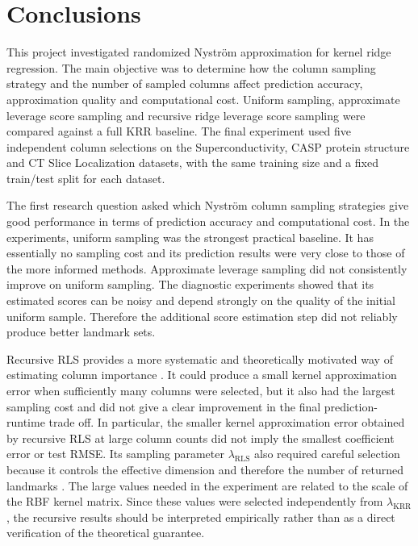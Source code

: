 \chapter{Conclusions}

This project investigated randomized Nystr\"om approximation for kernel ridge regression. The main objective was to determine how the column sampling strategy and the number of sampled columns affect prediction accuracy, approximation quality and computational cost. Uniform sampling, approximate leverage score sampling and recursive ridge leverage score sampling were compared against a full KRR baseline. The final experiment used five independent column selections on the Superconductivity, CASP protein structure and CT Slice Localization datasets, with the same training size and a fixed train/test split for each dataset.

The first research question asked which Nystr\"om column sampling strategies give good performance in terms of prediction accuracy and computational cost. In the experiments, uniform sampling was the strongest practical baseline. It has essentially no sampling cost and its prediction results were very close to those of the more informed methods. Approximate leverage sampling did not consistently improve on uniform sampling. The diagnostic experiments showed that its estimated scores can be noisy and depend strongly on the quality of the initial uniform sample. Therefore the additional score estimation step did not reliably produce better landmark sets.

Recursive RLS provides a more systematic and theoretically motivated way of estimating column importance \citep{musco2017recursive}. It could produce a small kernel approximation error when sufficiently many columns were selected, but it also had the largest sampling cost and did not give a clear improvement in the final prediction-runtime trade off. In particular, the smaller kernel approximation error obtained by recursive RLS at large column counts did not imply the smallest coefficient error or test RMSE. Its sampling parameter $\lambda_{\mathrm{RLS}}$ also required careful selection because it controls the effective dimension and therefore the number of returned landmarks \citep{alaoui2015fast,musco2017recursive}. The large values needed in the experiment are related to the scale of the RBF kernel matrix. Since these values were selected independently from $\lambda_{\mathrm{KRR}}$, the recursive results should be interpreted empirically rather than as a direct verification of the theoretical guarantee.

